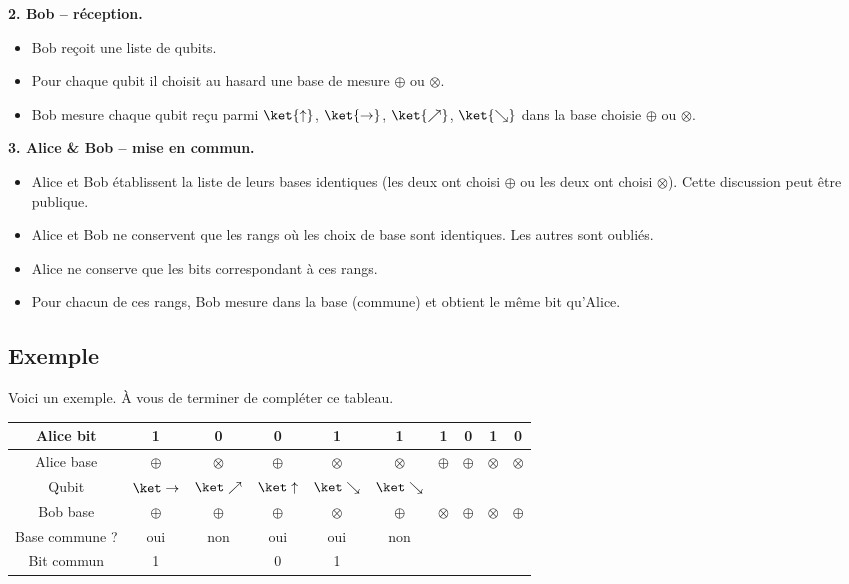 \documentclass[11pt,class=report,crop=false]{standalone}
\begin{document}
\medskip

\textbf{2. Bob -- réception.}

\begin{itemize}
  \item  Bob reçoit une liste de qubits.
  \item Pour chaque qubit il choisit au hasard une base de mesure $\oplus$ ou $\otimes$.
  \item Bob mesure chaque qubit reçu parmi $\ket{\uparrow}$, $\ket{\rightarrow}$, $\ket{\nearrow}$, $\ket{\searrow}$ dans la base choisie $\oplus$ ou $\otimes$.
\end{itemize}

\medskip

\textbf{3. Alice \& Bob -- mise en commun.}

\begin{itemize}
  \item Alice et Bob établissent la liste de leurs bases identiques (les deux ont choisi $\oplus$ ou les deux ont choisi $\otimes$). Cette discussion peut être publique.
  \item Alice et Bob ne conservent que les rangs où les choix de base sont identiques. Les autres sont oubliés.
  \item Alice ne conserve que les bits correspondant à ces rangs.
  \item Pour chacun de ces rangs, Bob mesure dans la base (commune) et obtient le même bit qu'Alice.
\end{itemize}


\subsection{Exemple}

Voici un exemple. \`A vous de terminer de compléter ce tableau.
\begin{center}
\begin{tabular}{|c|*{9}{|c}|}
\hline
Alice bit      & 1                 & 0               & 0               & 1              & 1              & 1 & 0 & 1 & 0 \\ \hline
Alice base     & $\oplus$          & $\otimes$       & $\oplus$        & $\otimes$      & $\otimes$      & $\oplus$ & $\oplus$ & $\otimes$ & $\otimes$ \\ \hline
Qubit          & $\ket\rightarrow$ & $\ket\nearrow$  & $\ket\uparrow$  & $\ket\searrow$ & $\ket\searrow$ & & & & \\ \hline
Bob base       & $\oplus$          & $\oplus$        & $\oplus$        & $\otimes$      & $\oplus$       & $\otimes$ & $\oplus$  & $\otimes$ & $\oplus$ \\ \hline
Base commune ? & oui               & non             & oui             & oui            & non            & \hphantom{xxx} & \hphantom{xxx}& \hphantom{xxx}& \hphantom{xxx}\\ \hline
Bit commun     & 1                 &                 & 0               & 1              &                & & & & \\ \hline
\end{tabular}
\end{center}
\end{document}
